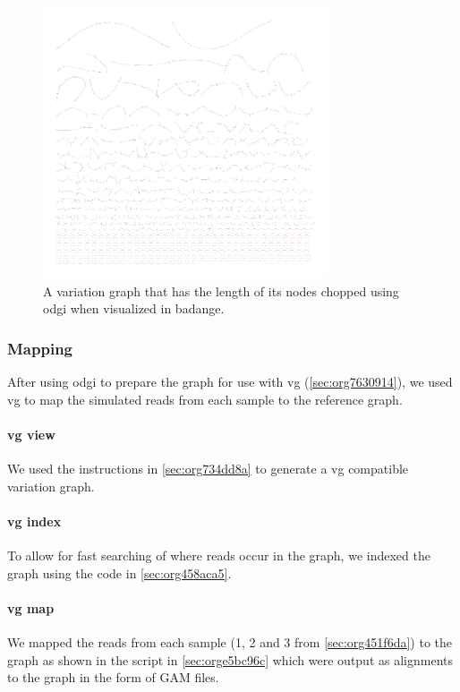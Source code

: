 \documentclass[10pt, a4paper]{article}
\begin{document}
\begin{figure}[h]
\centering
\includegraphics[width=0.75\textwidth]{../Figures/SARS_CoV_2/SARS_Variation_Graph.png}
\caption[SARS-CoV-2 Variation Graph]{\label{fig:org78589ec}
A variation graph that has the length of its nodes chopped using odgi when visualized in badange.}
\end{figure}

\subsubsection{Mapping}
\label{sec:orgbf14e7b}
After using odgi to prepare the graph for use with vg
(\ref{sec:org7630914}), we used vg to map the simulated reads from
each sample to the reference graph.

\paragraph{vg view}
\label{sec:org93aaf20}
We used the instructions in \ref{sec:org734dd8a} to generate a vg
\cite{garrisonVariationGraphToolkit2018} compatible variation graph. 

\paragraph{vg index}
\label{sec:org9646931}
To allow for fast searching of where reads occur in the graph, we indexed the 
graph using the code in \ref{sec:org458aca5}.

\paragraph{vg map}
\label{sec:org0fde26f}
We mapped the reads from each sample (1, 2 and 3 from \ref{sec:org451f6da})  to the 
graph as shown in the script in \ref{sec:orge5bc96c} which were output as  alignments to 
the graph in the form of GAM files. 
\end{document}
